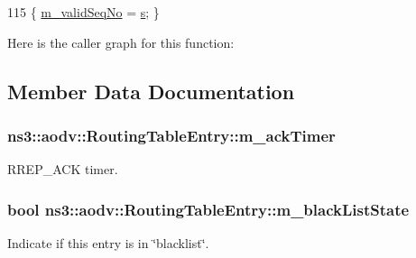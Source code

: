 \begin{DoxyCode}
115 \{ \hyperlink{classns3_1_1aodv_1_1RoutingTableEntry_a2541115c98ccaba8d4b0de6c19cf6c16}{m\_validSeqNo} = \hyperlink{generate__test__data__lte__sinr_8m_ad83eeb3a142285d1243a08c6b7026df8}{s}; \}
\end{DoxyCode}


Here is the caller graph for this function\+:




\subsection{Member Data Documentation}
\subsubsection[{\texorpdfstring{m\+\_\+ack\+Timer}{m_ackTimer}}]{ ns3\+::aodv\+::\+Routing\+Table\+Entry\+::m\+\_\+ack\+Timer}\hypertarget{classns3_1_1aodv_1_1RoutingTableEntry_a08fde93ee8431af5f9e2eadd9e1b93d2}{}\label{classns3_1_1aodv_1_1RoutingTableEntry_a08fde93ee8431af5f9e2eadd9e1b93d2}


R\+R\+E\+P\+\_\+\+A\+CK timer. 

\subsubsection[{\texorpdfstring{m\+\_\+black\+List\+State}{m_blackListState}}]{\setlength{\rightskip}{0pt plus 5cm}bool ns3\+::aodv\+::\+Routing\+Table\+Entry\+::m\+\_\+black\+List\+State\hspace{0.3cm}{\ttfamily [private]}}\hypertarget{classns3_1_1aodv_1_1RoutingTableEntry_a24aedb332d479344f3e53f8c084c2530}{}\label{classns3_1_1aodv_1_1RoutingTableEntry_a24aedb332d479344f3e53f8c084c2530}


Indicate if this entry is in \char`\"{}blacklist\char`\"{}. 

